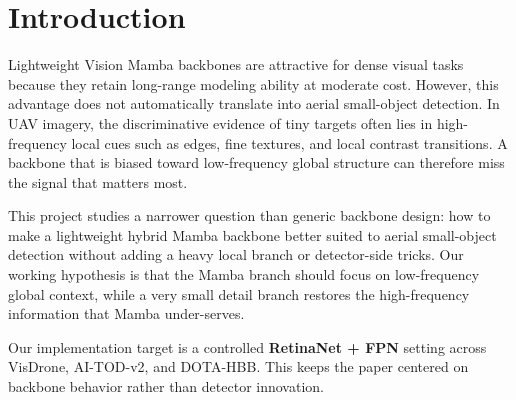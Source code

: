 \section{Introduction}

Lightweight Vision Mamba backbones are attractive for dense visual tasks because they retain long-range modeling ability at moderate cost. However, this advantage does not automatically translate into aerial small-object detection. In UAV imagery, the discriminative evidence of tiny targets often lies in high-frequency local cues such as edges, fine textures, and local contrast transitions. A backbone that is biased toward low-frequency global structure can therefore miss the signal that matters most.

This project studies a narrower question than generic backbone design: how to make a lightweight hybrid Mamba backbone better suited to aerial small-object detection without adding a heavy local branch or detector-side tricks. Our working hypothesis is that the Mamba branch should focus on low-frequency global context, while a very small detail branch restores the high-frequency information that Mamba under-serves.

Our implementation target is a controlled \textbf{RetinaNet + FPN} setting across VisDrone, AI-TOD-v2, and DOTA-HBB. This keeps the paper centered on backbone behavior rather than detector innovation.

